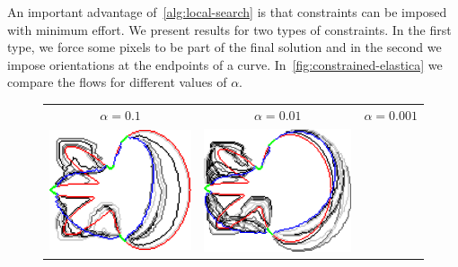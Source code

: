 An important advantage of~\cref{alg:local-search} is that constraints can be imposed with minimum effort. We present results for two types of constraints. In the first type, we force some pixels to be part of the final solution and in the second we impose orientations at the endpoints of a curve. In~\cref{fig:constrained-elastica} we compare the flows for different values of $\alpha$.


\begin{figure}
\center
\begin{tabular}{ccc}
$\alpha=0.1$ & $\alpha=0.01$ & $\alpha=0.001$\\[2em]
\includegraphics[scale=0.25]{figures/chapter5/fixed-pixels/elastica/len_pen_0.1/flower-1/summary.pdf} &
\includegraphics[scale=0.25]{figures/chapter5/fixed-pixels/elastica/len_pen_0.01/flower-1/summary.pdf} &

\end{tabular}
\end{figure}
